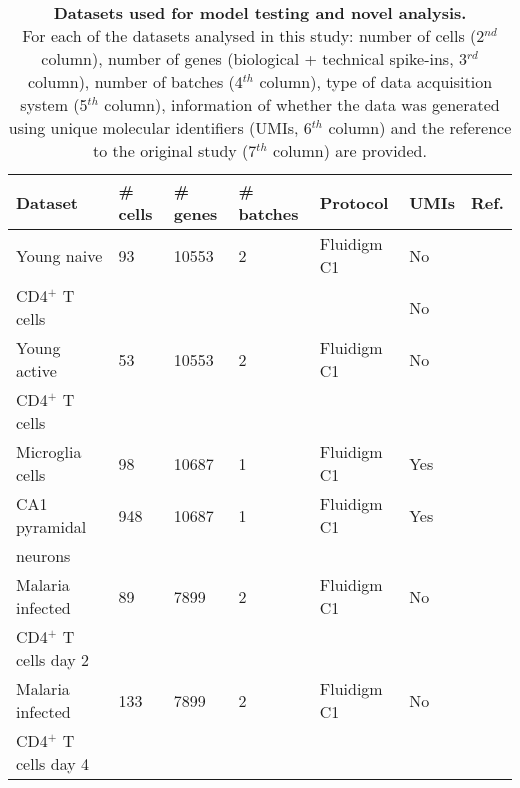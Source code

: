 \begin{table}[hb	]
\centering
\caption[Datasets used for model testing and novel analysis]{\textbf{Datasets used for model testing and novel analysis.} \\
For each of the datasets analysed in this study: number of cells (2$^{nd}$ column), number of genes (biological + technical spike-ins, 3$^{rd}$ column), number of batches (4$^{th}$ column), type of data acquisition system (5$^{th}$ column), information of whether the data was generated using unique molecular identifiers (UMIs, 6$^{th}$ column) and the reference to the original study (7$^{th}$ column) are provided.}
\label{tab2:datasets}
\begin{tabular}{lllllll}
\toprule
\textbf{Dataset} & \textbf{\# cells} & \textbf{\# genes} & \textbf{\# batches} & \textbf{Protocol} & \textbf{UMIs} & \textbf{Ref.}                       \\
\midrule
Young naive  & 93       & 10553    & 2          & Fluidigm C1       & No   & \citep{Martinez-jimenez2017} \\
CD4$^+$ T cells   &        &   &          &       & No   &  \\
\midrule

Young active    & 53       & 10553    & 2          & Fluidigm C1       & No   & \citep{Martinez-jimenez2017} \\
CD4$^+$ T cells    &        &     &           &        &    &  \\
\midrule

Microglia cells                         & 98       & 10687    & 1          & Fluidigm C1       & Yes  & \citep{Zeisel2015}           \\
\midrule

CA1 pyramidal                    & 948      & 10687    & 1          & Fluidigm C1       & Yes  & \citep{Zeisel2015}           \\
neurons       &       &     &           &       &   &           \\
\midrule

Malaria infected     & 89       & 7899     & 2          & Fluidigm C1       & No   & \citep{Lonnberg2017}         \\
CD4$^+$ T cells day 2     &        &      &          &  &    &  \\
\midrule

Malaria infected  & 133      & 7899     & 2          & Fluidigm C1       & No   & \citep{Lonnberg2017}         \\
CD4$^+$ T cells day 4     &       &      &    &  &    &\\
\midrule


\end{tabular}
\end{table}
